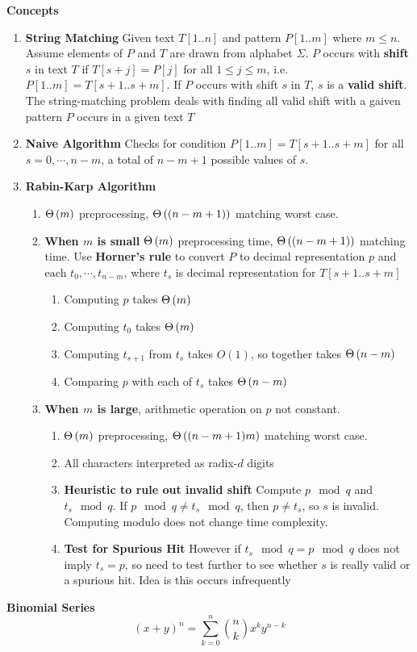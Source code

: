 \documentclass[11pt]{article}
\begin{document}
\begin{defn*}
    \textbf{Concepts}
    \begin{enumerate}
        \item \textbf{String Matching} Given text $T[1..n]$ and pattern $P[1..m]$ where $m\leq n$. Assume elements of $P$ and $T$ are drawn from alphabet $\Sigma$. $P$ occurs with \textbf{shift} $s$ in text $T$ if $T[s+j] = P[j]$ for all $1\leq j \leq m$, i.e. $P[1..m] = T[s+1..s+m]$. If $P$ occurs with shift $s$ in $T$, $s$ is a \textbf{valid shift}. The string-matching problem deals with finding all valid shift with a gaiven pattern $P$ occurs in a given text $T$
        \item \textbf{Naive Algorithm} Checks for condition $P[1..m] = T[s+1..s+m]$ for all $s = 0, \cdots, n-m$, a total of $n-m+1$ possible values of $s$.
        \item \textbf{Rabin-Karp Algorithm} 
        \begin{enumerate}
            \item $\Theta\left( m \right)$ preprocessing, $\Theta\left( (n-m+1) \right)$ matching worst case. 
            \item \textbf{When $m$ is small} $\Theta\left( m \right)$ preprocessing time, $\Theta\left( (n-m+1) \right)$ matching time. Use \textbf{Horner's rule} to convert $P$ to decimal representation $p$ and each $t_0, \cdots, t_{n-m}$, where $t_s$ is decimal representation for $T[s+1..s+m]$
            \begin{enumerate}
                \item Computing $p$ takes $\Theta\left( m \right)$ 
                \item Computing $t_0$ takes $\Theta\left( m \right)$
                \item Computing $t_{s+1}$ from $t_s$ takes $O(1)$, so together takes $\Theta\left( n-m \right)$
                \item Comparing $p$ with each of $t_s$ takes $\Theta\left( n-m \right)$
            \end{enumerate}
            \item \textbf{When $m$ is large}, arithmetic operation on $p$ not constant. 
            \begin{enumerate}
                \item $\Theta\left( m \right)$ preprocessing, $\Theta\left( (n-m+1)m \right)$ matching worst case. 
                \item All characters interpreted as radix-$d$ digits
                \item \textbf{Heuristic to rule out invalid shift} Compute $p \mod q$ and $t_s \mod q$. If $p \mod q \neq t_s \mod q$, then $p \neq t_s$, so $s$ is invalid. Computing modulo does not change time complexity. 
                \item \textbf{Test for Spurious Hit} However if $t_s \mod q = p \mod q$ does not imply $t_s = p$, so need to test further to see whether $s$ is really valid or a spurious hit. Idea is this occurs infrequently
            \end{enumerate}
        \end{enumerate}
    \end{enumerate}
\end{defn*}


\begin{defn*}
    \textbf{Binomial Series}
    \[
        (x+y)^n = \sum_{k=0}^n \binom{n}{k} x^k y^{n-k}
    \]
\end{defn*}
\end{document}
